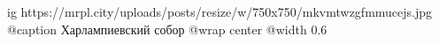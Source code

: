  
 
 
 
 

\ifcmt
  ig https://mrpl.city/uploads/posts/resize/w/750x750/mkvmtwzgfmmucejs.jpg
	@caption Харлампиевский собор
  @wrap center
  @width 0.6
\fi
